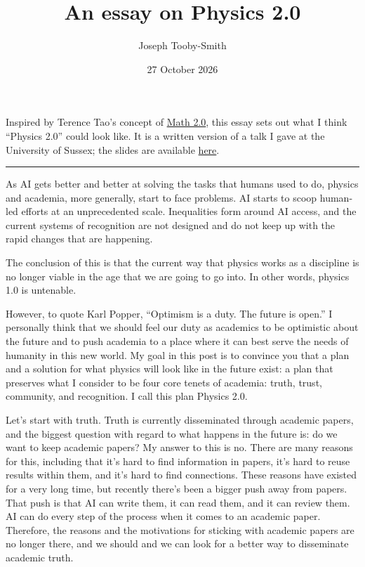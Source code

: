 \documentclass[11pt,a4paper]{article}
\title{An essay on Physics 2.0}
\author{Joseph Tooby-Smith}
\date{27 October 2026}
\begin{document}
\maketitle

\noindent Inspired by Terence Tao's concept of \href{https://terrytao.wordpress.com/2026/10/10/math-2-0/}{Math 2.0}, this essay sets out what I think ``Physics 2.0'' could look like. It is a written version of a talk I gave at the University of Sussex; the slides are available \href{https://josephtoobysmith.com/Slides/Sussex2026/Sussex2026.pdf}{here}.

\begin{center}\rule{0.3\textwidth}{0.4pt}\end{center}

As AI gets better and better at solving the tasks that humans used to do, physics and academia, more generally, start to face problems. AI starts to scoop human-led efforts at an unprecedented scale. Inequalities form around AI access, and the current systems of recognition are not designed and do not keep up with the rapid changes that are happening.

The conclusion of this is that the current way that physics works as a discipline is no longer viable in the age that we are going to go into. In other words, physics 1.0 is untenable.

However, to quote Karl Popper, ``Optimism is a duty. The future is open.'' I personally think that we should feel our duty as academics to be optimistic about the future and to push academia to a place where it can best serve the needs of humanity in this new world. My goal in this post is to convince you that a plan and a solution for what physics will look like in the future exist: a plan that preserves what I consider to be four core tenets of academia: truth, trust, community, and recognition. I call this plan Physics 2.0.

Let's start with truth. Truth is currently disseminated through academic papers, and the biggest question with regard to what happens in the future is: do we want to keep academic papers? My answer to this is no. There are many reasons for this, including that it's hard to find information in papers, it's hard to reuse results within them, and it's hard to find connections. These reasons have existed for a very long time, but recently there's been a bigger push away from papers. That push is that AI can write them, it can read them, and it can review them. AI can do every step of the process when it comes to an academic paper. Therefore, the reasons and the motivations for sticking with academic papers are no longer there, and we should and we can look for a better way to disseminate academic truth.
\end{document}
